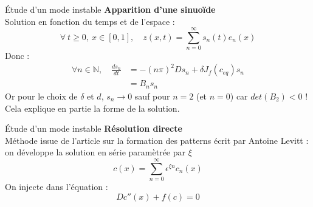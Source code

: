 \documentclass{beamer}
\begin{document}
\begin{frame}{\'Etude d'un mode instable}
\textbf{Apparition d'une sinuoïde}\\
Solution en fonction du temps et de l'espace :
\begin{equation}
    \forall \  t\geq 0 ,\ x \in [0,1], \quad  z(x,t) = \sum_{n=0}^{\infty} s_{n}(t)e_{n}(x)
\end{equation}
Donc : 
\begin{equation}
\begin{split}
    \forall n \in \mathbb{N}, \quad \frac{d s_{n}}{dt} & = -(n \pi)^{2}D s_{n} + \delta J_{f}(c_{eq}) s_{n} \\
    & = B_{n} s_{n}
\end{split}
\end{equation}
Or pour le choix de $\delta$ et $d$, $s_n \longrightarrow 0$ sauf pour $n=2$ (et $n=0$) car $det(B_2)<0$ ! Cela explique en partie la forme de la solution.
\end{frame}

\begin{frame}{\'Etude d'un mode instable}
\textbf{Résolution directe}\\
Méthode issue de l'article sur la formation des patterns écrit par Antoine Levitt : on développe la solution en série paramètrée par $\xi$
\begin{equation}
c(x) = \sum_{n=0}^{\infty} \epsilon^{\xi n} c_n (x)
\end{equation}
On injecte dans l'équation : 
\begin{equation}
Dc''(x) + f(c)=0
\end{equation}
\end{frame}
\end{document}
